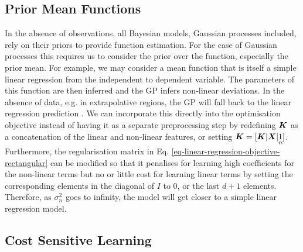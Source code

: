 \documentclass[useAMS,usenatbib,fleqn]{mn2e}
\begin{document}
\subsection{Prior Mean Functions}

In the absence of observations, all Bayesian models, Gaussian processes included, rely on their priors to provide function estimation. For the case of Gaussian processes this requires us to consider the prior over the function, especially the prior mean. For example, we may consider a mean function that is itself a simple linear regression from the independent to dependent variable. The parameters of this function are then inferred and the GP infers non-linear deviations. In the absence of data, e.g. in extrapolative regions, the GP will fall back to the linear regression prediction \citep{roberts2012rs}. We can incorporate this directly into the optimisation objective instead of having it as a separate preprocessing step by redefining $\bmath{K}$ as a concatenation of the linear and non-linear features, or setting $\bmath{K}=[\bmath{K}|\bmath{X}|\underset{n}{1}]$. Furthermore, the regularisation matrix in Eq. \eqref{eq-linear-regression-objective-rectangular} can be modified so that it penalises for learning high coefficients for the non-linear terms but no or little cost for learning linear terms by setting the corresponding elements in the diagonal of $I$ to 0, or the last $d+1$ elements. Therefore, as $\sigma_{n}^{2}$ goes to infinity, the model will get closer to a simple linear regression model.

\subsection{Cost Sensitive Learning}
\end{document}

